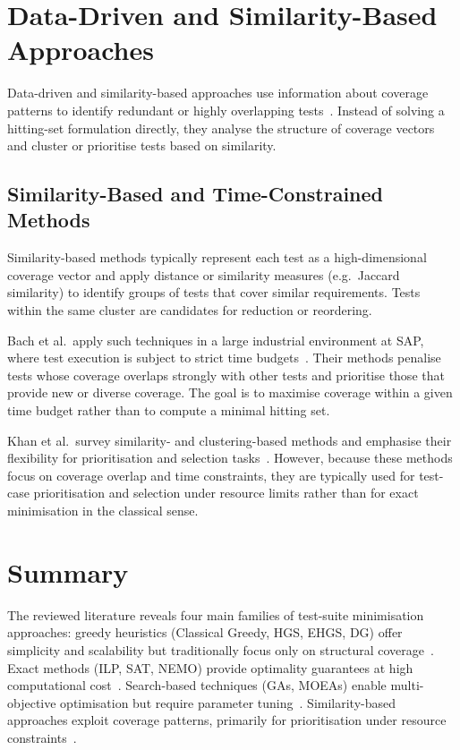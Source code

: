 \section{Data-Driven and Similarity-Based Approaches}

Data-driven and similarity-based approaches use information about coverage
patterns to identify redundant or highly overlapping tests~\cite{yoo2012,khan2020}.
Instead of solving a hitting-set formulation directly, they analyse the structure
of coverage vectors and cluster or prioritise tests based on similarity.

\subsection{Similarity-Based and Time-Constrained Methods}

Similarity-based methods typically represent each test as a high-dimensional
coverage vector and apply distance or similarity measures (e.g.\ Jaccard
similarity) to identify groups of tests that cover similar requirements.
Tests within the same cluster are candidates for reduction or reordering.

Bach et al.\ apply such techniques in a large industrial environment at SAP,
where test execution is subject to strict time budgets~\cite{bach2017}. Their
methods penalise tests whose coverage overlaps strongly with other tests and
prioritise those that provide new or diverse coverage. The goal is to maximise
coverage within a given time budget rather than to compute a minimal hitting set.

Khan et al.\ survey similarity- and clustering-based methods and emphasise their
flexibility for prioritisation and selection tasks~\cite{khan2020}. However,
because these methods focus on coverage overlap and time constraints, they are
typically used for test-case prioritisation and selection under resource limits
rather than for exact minimisation in the classical sense.



\section{Summary}

The reviewed literature reveals four main families of test-suite minimisation approaches: greedy heuristics (Classical Greedy, HGS, EHGS, DG) offer simplicity and scalability but traditionally focus only on structural coverage~\cite{yoo2012,noemmer2020,gladston2015}. Exact methods (ILP, SAT, NEMO) provide optimality guarantees at high computational cost~\cite{elbaum2002,lin2018}. Search-based techniques (GAs, MOEAs) enable multi-objective optimisation but require parameter tuning~\cite{wei2017,khan2020}. Similarity-based approaches exploit coverage patterns, primarily for prioritisation under resource constraints~\cite{bach2017}.

